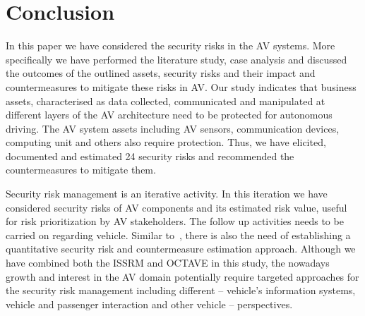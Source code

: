 \documentclass[runningheads]{llncs}
\begin{document}
\section{Conclusion}
\label{sec:conc}
In this paper we have considered the security risks in the AV systems. More specifically we have performed the literature study, case analysis and discussed the outcomes of the outlined assets, security risks and their impact and countermeasures to mitigate these risks in AV. Our study indicates that business assets, characterised as data collected, communicated and manipulated at different layers of the AV architecture need to be protected for autonomous driving. The AV system assets including AV sensors, communication devices, computing unit and others also require protection. Thus, we have elicited, documented and estimated 24 security risks and recommended the countermeasures to mitigate them. 

Security risk management is an iterative activity. In this iteration we have considered security risks of AV components and its estimated risk value, useful for risk prioritization by AV stakeholders. The follow up activities needs to be carried on regarding vehicle. Similar to~\cite{Bailey2018}, there is also the need of establishing a quantitative security risk and countermeasure estimation approach. Although we have combined both the ISSRM and OCTAVE in this study, the nowadays growth and interest in the AV domain potentially require targeted approaches for the security risk management including different -- vehicle's information systems, vehicle and passenger interaction and other vehicle -- perspectives.





\end{document}
